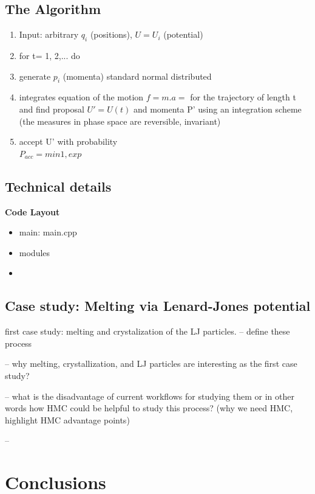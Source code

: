 \documentclass[journal=jpcbfk,layout=traditional]{achemso}
\begin{document}
\subsection{The Algorithm}

\begin{enumerate}
    \item Input: arbitrary $q_i$ (positions), $U={U_i}$ (potential)
    \item for t= 1, 2,... do 
    \item generate $p_i$ (momenta) standard normal distributed
    \item integrates equation of the motion $f=m.a=$ for the trajectory of length t and find proposal $U'=U(t)$ and momenta P' using an integration scheme (the measures in phase space are reversible, invariant)
    \item accept U' with probability\\
    $P_{acc}=min{1, exp}$
\end{enumerate}
\subsection{Technical details}


\large\textbf{Code Layout}
\begin{itemize}
    \item main: main.cpp
    \item modules
    \item
    
\end{itemize}


\subsection{Case study: Melting via Lenard-Jones potential}




first case study: melting and crystalization of the LJ particles.
-- define these process 


-- why melting, crystallization, and LJ particles are interesting as the first case study?


-- what is the disadvantage of current workflows for studying them or in other words how HMC could be helpful to study this process?
(why we need HMC, highlight HMC advantage points)


--






\newpage
\section{Conclusions}


\begin{acknowledgement}
 
\end{acknowledgement}




\end{document}
